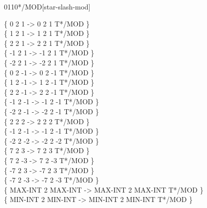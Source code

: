 \begin{worddef}{0110}{*/MOD}[star-slash-mod]
\begin{defer}
		\{       0 2       1  ->       0 2       1 T*/MOD \} \\
		\{       1 2       1  ->       1 2       1 T*/MOD \} \\
		\{       2 2       1  ->       2 2       1 T*/MOD \} \\
		\{      -1 2       1  ->      -1 2       1 T*/MOD \} \\
		\{      -2 2       1  ->      -2 2       1 T*/MOD \} \\
		\{       0 2      -1  ->       0 2      -1 T*/MOD \} \\
		\{       1 2      -1  ->       1 2      -1 T*/MOD \} \\
		\{       2 2      -1  ->       2 2      -1 T*/MOD \} \\
		\{      -1 2      -1  ->      -1 2      -1 T*/MOD \} \\
		\{      -2 2      -1  ->      -2 2      -1 T*/MOD \} \\
		\{       2 2       2  ->       2 2       2 T*/MOD \} \\
		\{      -1 2      -1  ->      -1 2      -1 T*/MOD \} \\
		\{      -2 2      -2  ->      -2 2      -2 T*/MOD \} \\
		\{       7 2       3  ->       7 2       3 T*/MOD \} \\
		\{       7 2      -3  ->       7 2      -3 T*/MOD \} \\
		\{      -7 2       3  ->      -7 2       3 T*/MOD \} \\
		\{      -7 2      -3  ->      -7 2      -3 T*/MOD \} \\
		\{ MAX-INT 2 MAX-INT  -> MAX-INT 2 MAX-INT T*/MOD \} \\
		\{ MIN-INT 2 MIN-INT  -> MIN-INT 2 MIN-INT T*/MOD \} \\
	\end{defer}
\end{worddef}


